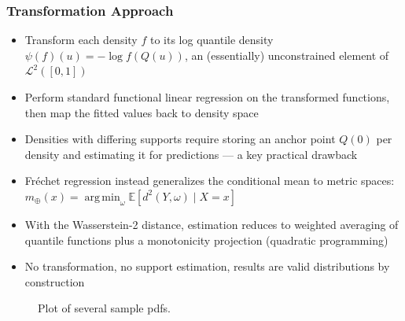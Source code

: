 \documentclass[11pt, aspectratio=169]{beamer}
\DeclareMathOperator*{\argmin}{arg\,min}
\begin{document}
\begin{frame}[allowframebreaks]
    \frametitle{Transformation Approach}
    \begin{itemize}
        \item Transform each density $f$ to its log quantile density
        $\psi(f)(u) = -\log f(Q(u))$, an (essentially) unconstrained element of
        $\mathcal{L}^2([0,1])$
        \item Perform standard functional linear regression on the transformed
        functions, then map the fitted values back to density space
        \item Densities with differing supports require storing an anchor point
        $Q(0)$ per density and estimating it for predictions
        \parencite{KokoszkaEtAl2019} --- a key practical drawback
    \end{itemize}
    \framebreak
    \begin{itemize}
        \item Fréchet regression instead generalizes the conditional mean to metric
        spaces: $m_\oplus(x) = \argmin_{\omega} \mathbb{E}[d^2(Y, \omega) \mid X = x]$
        \item With the Wasserstein-2 distance, estimation reduces to weighted
        averaging of quantile functions plus a monotonicity projection
        (quadratic programming)
        \item No transformation, no support estimation, results are valid
        distributions by construction
    \end{itemize}
\end{frame}



\begin{frame}[plain]
    \begin{figure}
        \centering
        \resizebox{0.9\textwidth}{0.9\textheight}{}
        \caption[Several sampled pdfs]{Plot of several sample pdfs.}
        \label{fig:some_densities}
    \end{figure}
\end{frame}
\end{document}
